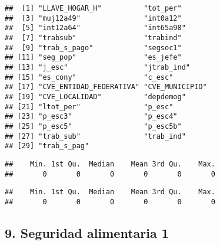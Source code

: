 \documentclass[11pt,]{article}
\newenvironment{Shaded}{\begin{snugshade}}{\end{snugshade}}
\newcommand{\KeywordTok}[1]{\textcolor[rgb]{0.13,0.29,0.53}{\textbf{#1}}}
\newcommand{\OperatorTok}[1]{\textcolor[rgb]{0.81,0.36,0.00}{\textbf{#1}}}
\newcommand{\NormalTok}[1]{#1}
\begin{document}
\begin{verbatim}
##  [1] "LLAVE_HOGAR_H"          "tot_per"               
##  [3] "muj12a49"               "int0a12"               
##  [5] "int12a64"               "int65a98"              
##  [7] "trabsub"                "trabind"               
##  [9] "trab_s_pago"            "segsoc1"               
## [11] "seg_pop"                "es_jefe"               
## [13] "j_esc"                  "jtrab_ind"             
## [15] "es_cony"                "c_esc"                 
## [17] "CVE_ENTIDAD_FEDERATIVA" "CVE_MUNICIPIO"         
## [19] "CVE_LOCALIDAD"          "depdemog"              
## [21] "ltot_per"               "p_esc"                 
## [23] "p_esc3"                 "p_esc4"                
## [25] "p_esc5"                 "p_esc5b"               
## [27] "trab_sub"               "trab_ind"              
## [29] "trab_s_pag"
\end{verbatim}

\begin{Shaded}
\end{Shaded}

\begin{verbatim}
##    Min. 1st Qu.  Median    Mean 3rd Qu.    Max. 
##       0       0       0       0       0       0
\end{verbatim}

\begin{Shaded}
\end{Shaded}

\begin{verbatim}
##    Min. 1st Qu.  Median    Mean 3rd Qu.    Max. 
##       0       0       0       0       0       0
\end{verbatim}

\subsection{9. Seguridad alimentaria 1}\label{seguridad-alimentaria-1}
\end{document}
